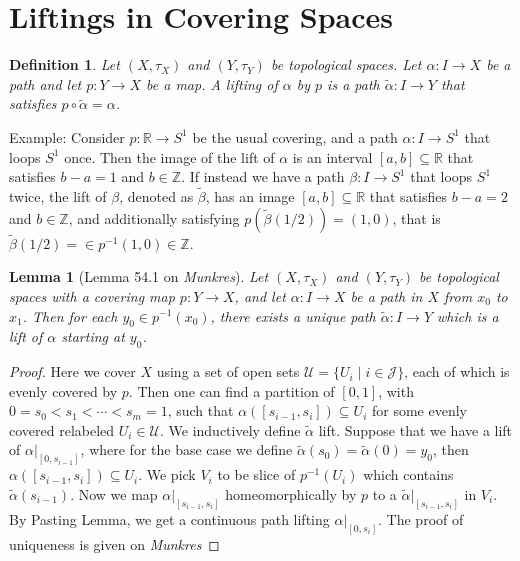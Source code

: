 \documentclass[11pt]{book}
\theoremstyle{break}
\theoremstyle{break}
\newtheorem{lem}{Lemma}[thm]
\newtheorem{defn}{Definition}[corL]
\newcommand{\R}{\mathbb{R}}
\newcommand{\Z}{\mathbb{Z}}
\newcommand{\that}[1]{\widetilde{#1}}
\newcommand{\example}{\color{green}Example: \color{black}}
\begin{document}
\newpage
\section[Liftings]{\color{red}Liftings in Covering Spaces\color{black}}

\begin{defn}
Let $(X,\tau_X)$ and $(Y,\tau_Y)$ be topological spaces. 
Let $\alpha: I \to X$ be a path and let $p:Y \to X$ be a map. A lifting of $\alpha$ by $p$ is a path $\that{\alpha}:I \to Y$ that satisfies $p\circ \that{\alpha} = \alpha$. 
\end{defn}

\example Consider $p : \R \to S^1$ be the usual covering, and a path $\alpha:I \to S^1$ that loops $S^1$ once. Then the image of the lift of $\alpha$ is an interval $[a,b]\subseteq \R$ that satisfies $b-a  = 1$ and $b \in \Z$. If instead we have a path $\beta: I \to S^1$ that loops $S^1$ twice, the lift of $\beta$, denoted as $\that{\beta}$, has an image $[a,b]\subseteq \R$ that satisfies $b-a = 2$ and $b \in \Z$, and additionally satisfying $p(\that{\beta}(1/2)) = (1,0)$, that is $\that{\beta}(1/2) =\in p^{-1}(1,0) \in \Z$. 

\begin{lem}[Lemma 54.1 on \textit{Munkres}]
Let $(X,\tau_X)$ and $(Y,\tau_Y)$ be topological spaces with a covering map $p:Y \to X$, and let $\alpha:I \to X$ be a path in $X$ from $x_0$ to $x_1$. Then for each $y_0 \in p^{-1}(x_0)$, there exists a unique path $\that{\alpha }:I \to Y$ which is a lift of $\alpha$ starting at $y_0$.  
\end{lem}
\begin{proof}
Here we cover $X$ using a set of open sets $\mathcal{U} = \{U_i \mid i \in \mathcal{J}\}$, each of which is evenly covered by $p$. Then one can find a partition of $[0,1]$, with $0=s_0 < s_1 <  \cdots < s_m = 1$, such that $\alpha([s_{i-1}, s_i]) \subseteq U_i$ for some evenly covered relabeled $U_i\in \mathcal{U}$. We inductively define $\that{\alpha}$ lift. Suppose that we have a lift of $\alpha|_{[0,s_{i-1}]}$, where for the base case we define $\that{\alpha}(s_0)=\that{\alpha}(0) = y_0$, then $\alpha([s_{i-1}, s_i])\subseteq U_i$. We pick $V_i $ to be slice of $p^{-1}(U_i)$ which contains $\that{\alpha}(s_{i-1})$. Now we map $\alpha|_{[s_{i-1},s_i]}$ homeomorphically by $p$ to a $\that{\alpha}|_{[s_{i-1},s_i]}$ in $V_i$. By Pasting Lemma, we get a continuous path lifting $\alpha|_{[0,s_i]}$. The proof of uniqueness is given on \textit{Munkres}
\end{proof}
\end{document}
